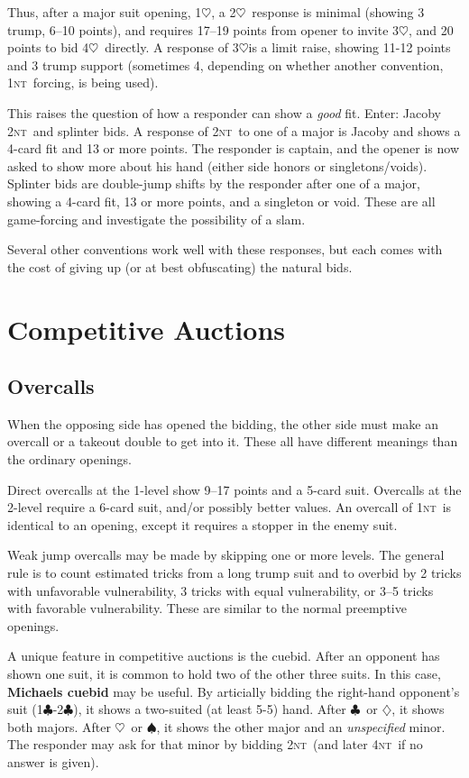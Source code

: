 \documentclass[11pt]{article}
\def\C{$\clubsuit$}
\def\D{$\diamondsuit$}
\def\H{$\heartsuit$}
\def\S{$\spadesuit$}
\def\NT{\textsc{nt}}
\begin{document}
Thus, after a major suit opening, 1\H, a 2\H\ response is minimal
(showing 3 trump, 6--10 points), and requires 17--19 points from opener
to invite 3\H, and 20 points to bid 4\H\ directly.  A response of
3\H is a limit raise, showing 11-12 points and 3 trump support
(sometimes 4, depending on whether another convention, 1\NT\ forcing,
is being used).

This raises the question of how a responder can show a \emph{good} fit.
Enter: Jacoby 2\NT\ and splinter bids.  A response of 2\NT\ to one
of a major is Jacoby and shows a 4-card fit and 13 or more points.
The responder is captain, and the opener is now asked to show more
about his hand (either side honors or singletons/voids).  Splinter
bids are double-jump shifts by the responder after one of a major, 
showing a 4-card fit, 13 or more points, and a singleton or void.
These are all game-forcing and investigate the possibility of a slam.

Several other conventions work well with these responses, but each
comes with the cost of giving up (or at best obfuscating) the
natural bids.

\section{Competitive Auctions}

\subsection{Overcalls}
When the opposing side has opened the bidding, the other side
must make an overcall or a takeout double to get into it.  These
all have different meanings than the ordinary openings.

Direct overcalls at the 1-level show 9--17 points and a 5-card suit.
Overcalls at the 2-level require a 6-card suit, and/or possibly better
values.  An overcall of 1\NT\ is identical to an opening, except it
requires a stopper in the enemy suit.

Weak jump overcalls may be made by skipping one or more levels.
The general rule is to count estimated tricks from a long trump
suit and to overbid by 2 tricks with unfavorable vulnerability,
3 tricks with equal vulnerability, or 3--5 tricks with
favorable vulnerability.  These are similar to the normal
preemptive openings.

A unique feature in competitive auctions is the cuebid.  After an
opponent has shown one suit, it is common to hold two of the
other three suits.  In this case, \textbf{Michaels cuebid} may be useful.
By articially bidding the right-hand opponent's suit (1\C-2\C),
it shows a two-suited (at least 5-5) hand.  After \C\ or \D,
it shows both majors.  After \H\ or \S, it shows the other
major and an \emph{unspecified} minor.  The responder may ask
for that minor by bidding 2\NT\ (and later 4\NT\ if no answer is
given).
\end{document}
